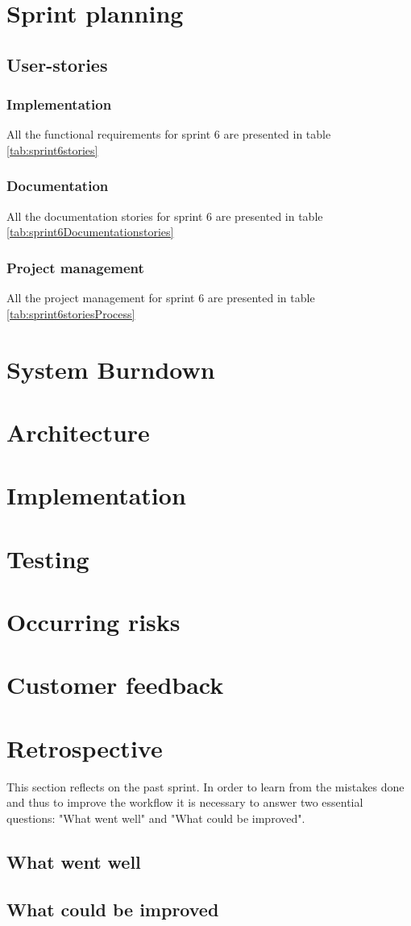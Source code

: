 \section{Sprint planning}
\subsection{User-stories}
\subsubsection*{Implementation}
All the functional requirements for sprint 6 are presented in table \ref{tab:sprint6stories}

\subsubsection*{Documentation}
All the documentation stories for sprint 6 are presented in table \ref{tab:sprint6Documentationstories}

\subsubsection*{Project management}
All the project management for sprint 6 are presented in table \ref{tab:sprint6storiesProcess}
\section{System Burndown}
\section{Architecture}
\section{Implementation}
\section{Testing}
\section{Occurring risks}
\section{Customer feedback}
\section{Retrospective}
This section reflects on the past sprint. In order to learn from the mistakes done and thus to improve the workflow it is necessary to answer two essential questions: "What went well" and "What could be improved".

\subsection{What went well}
\subsection{What could be improved}
